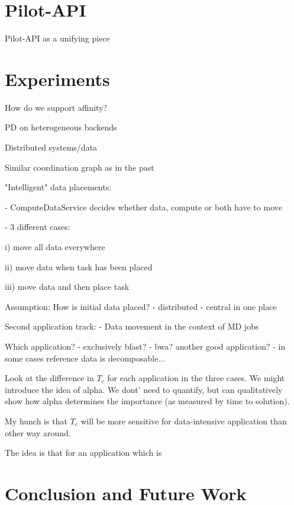 \documentclass[conference]{IEEEtran}
\begin{document}
\section{Pilot-API}
Pilot-API as a unifying piece


\section{Experiments}

How do we support affinity?

PD on heterogeneous backends

Distributed systems/data

Similar coordination graph as in the past

"Intelligent" data placements:

- ComputeDataService decides whether data, compute or both have to move

- 3 different cases:

i) move all data everywhere

ii) move data when task has been placed

iii) move data and then place task

Assumption:
How is initial data placed?
- distributed
- central in one place

Second application track:
- Data movement in the context of MD jobs

Which application?
- exclusively bfast?
- bwa? another good application?
- in some cases reference data is decomposable...

Look at the difference in $T_c$ for each application in the three
cases. We might introduce the idea of alpha. We dont' need to
quantify, but can qualitatively show how alpha determines the
importance (as measured by time to solution). 

My hunch is that $T_c$ will be more sensitive for data-intensive
application than other way around.

The idea is that for an application which is



\section{Conclusion and Future Work}
\end{document}
